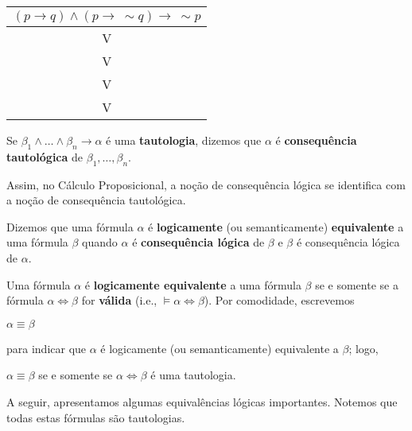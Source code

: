 \begin{center}
    \begin{tabular}{c}
        $(p \to q) \land (p \to\ \sim q) \to\ \sim p$ \\ \hline
        V \\
        V \\
        V \\
        V \\
    \end{tabular}
\end{center}

\begin{defi}
    Se $\beta_1 \land \dots \land \beta_n \to \alpha$ é uma \textbf{tautologia}, dizemos que $\alpha$ é \textbf{consequência tautológica} de $\beta_1, \dots, \beta_n$.
\end{defi}

Assim, no Cálculo Proposicional, a noção de consequência lógica se identifica com a noção de consequência tautológica.

\begin{defi}
    Dizemos que uma fórmula $\alpha$ é \textbf{logicamente} (ou semanticamente) \textbf{equivalente} a uma fórmula $\beta$ quando $\alpha$ é \textbf{consequência lógica} de $\beta$ e $\beta$ é consequência lógica de $\alpha$.
\end{defi}

\begin{obs}
Uma fórmula $\alpha$ é \textbf{logicamente equivalente} a uma fórmula $\beta$ se e somente se a fórmula $\alpha \iff \beta$ for \textbf{válida} (i.e., $\vDash \alpha \iff \beta$). Por comodidade, escrevemos
\end{obs}

\centerline{$\alpha \equiv \beta$}
\noindent para indicar que $\alpha$ é logicamente (ou semanticamente) equivalente a $\beta$; logo,
\centerline{$\alpha \equiv \beta$ se e somente se $\alpha \iff \beta$ é uma tautologia.}

A seguir, apresentamos algumas equivalências lógicas importantes.
Notemos que todas estas fórmulas são tautologias.


